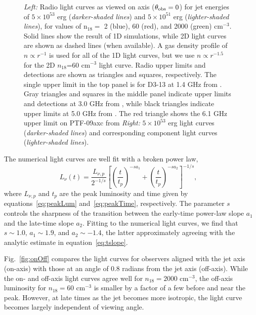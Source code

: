 \documentclass[usenatbib,fleqn]{mnras}
\begin{document}
\begin{figure}
  \caption{\label{fig:lightcurves} \textit{Left:} Radio light curves
    as viewed on axis ($\theta_{\rm obs}=0$) for jet energies of
    $5\times 10^{53}$ erg ({\it darker-shaded lines}) and $5\times
    10^{51}$ erg ({\it lighter-shaded lines}), for values of n$_{18}=$
    2 (blue), 60 (red), and 2000 (green) cm$^{-3}$.  Solid lines show
    the result of 1D simulations, while 2D light curves are shown as
    dashed lines (when available).  A gas density profile of $n\propto
    r^{-1}$ is used for all of the 1D light curves, but we use
    $n\propto r^{-1.5}$ for the 2D $n_{18}$=60 cm$^{-3}$ light curve.
    Radio upper limits and detections are shown as triangles and
    squares, respectively.  The single upper limit in the top panel is
    for D3-13 at 1.4 GHz from \citet{Bower2011}.  Gray triangles and
    squares in the middle panel indicate upper limits and detections
    at 3.0 GHz from \citet{Bower+2013}, while black triangles indicate
    upper limits at 5.0 GHz from \citet{van-Velzen+2013}.  The red
    triangle shows the 6.1 GHz upper limit on PTF-09axc from
    \citet{Arcavi+2014} \textit{Right:} $5\times 10^{53}$ erg light
    curves ({\it darker-shaded lines}) and corresponding component
    light curves ({\it lighter-shaded lines}).}
\end{figure}

The numerical light curves are well fit with a broken power law,
\begin{equation}
L_\nu (t) =\frac{L_{\nu, p}}{2^{-1/s}}
\left[\left(\frac{t}{t_p}\right)^{-s
    a_1}+\left(\frac{t}{t_p}\right)^{-s a_2}\right]^{-1/s}, 
\label{eq:lcAnal}\end{equation}
where $L_{\nu, p}$ and $t_p$ are the peak luminosity and time given by
equations~\eqref{eq:peakLum} and~\eqref{eq:peakTime}, respectively.
The parameter $s$ controls the sharpness of the transition between the
early-time power-law slope $a_1$ and the late-time slope $a_2$.
Fitting to the numerical light curves, we find that $s\sim 1.0$,
$a_1\sim 1.9$, and $a_2\sim -1.4$, the latter approximately agreeing
with the analytic estimate in equation~\eqref{eq:tslope}.


Fig.~\ref{fig:onOff} compares the light curves for observers aligned
with the jet axis (on-axis) with those at an angle of 0.8 radians from
the jet axis (off-axis).  While the on- and off-axis light curves
agree well for $n_{18}=2000$ cm$^{-3}$, the off-axis luminosity for
$n_{18}=60$ cm$^{-3}$ is smaller by a factor of a few before and near
the peak.  However, at late times as the jet becomes more isotropic,
the light curve becomes largely independent of viewing angle.
\end{document}
